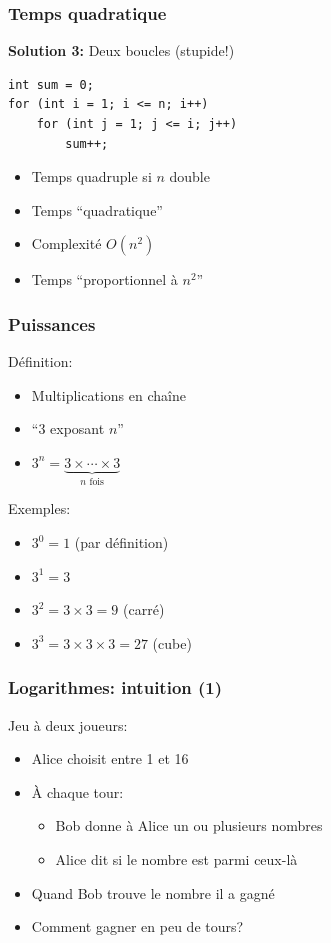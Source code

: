 \documentclass[12pt]{beamer}
\begin{document}
\begin{frame}[fragile]
\frametitle{Temps quadratique}
\textbf{Solution 3:} Deux boucles (stupide!)
\begin{lstlisting}
int sum = 0;
for (int i = 1; i <= n; i++)
    for (int j = 1; j <= i; j++)
        sum++;
\end{lstlisting}
\begin{itemize}
\item Temps quadruple si $n$ double
\item Temps ``quadratique''
\item Complexité $O(n^2)$
\item Temps ``proportionnel à $n^2$''
\end{itemize}
\end{frame}

\begin{frame}
\frametitle{Puissances}
Définition:
\begin{itemize}
\item Multiplications en chaîne
\item ``3 exposant $n$''
\item $3^n = \underbrace{3\times\cdots\times3}_\text{$n$ fois}$
\end{itemize}
Exemples:
\begin{itemize}
\item $3^0 = 1$ (par définition)
\item $3^1 = 3$
\item $3^2 = 3 \times 3 = 9$ (carré)
\item $3^3 = 3 \times 3 \times 3 = 27$ (cube)
\end{itemize}
\end{frame}

\begin{frame}
\frametitle{Logarithmes: intuition (1)}
Jeu à deux joueurs:
\begin{itemize}
\item Alice choisit entre 1 et 16
\item À chaque tour:
    \begin{itemize}
    \item Bob donne à Alice un ou plusieurs nombres
    \item Alice dit si le nombre est parmi ceux-là 
    \end{itemize}
\item Quand Bob trouve le nombre il a gagné
\item Comment gagner en peu de tours?
\end{itemize}
\end{frame}
\end{document}
